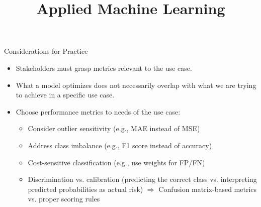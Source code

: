 \documentclass[11pt,compress,t,notes=noshow, aspectratio=169, xcolor=table]{beamer}
\title{Applied Machine Learning}
\date{}
\begin{document}
\newcommand{\titlefigure}{figure/dtrain_dtest_resampling}
\newcommand{\learninggoals}{
\item What is the difference between a loss function and a performance metric?
\item What are desirable properties of a performance metric?
\item What are guiding questions to select a performance metric?}



\begin{frame}{Considerations for Practice}

\begin{itemize}
    \item Stakeholders must grasp metrics relevant to the use case.
    \item What a model optimizes does not necessarily overlap with what we are trying to achieve in a specific use case.
    \item Choose performance metrics to needs of the use case:
    \begin{itemize}
        \item Consider outlier sensitivity (e.g., MAE instead of MSE)
        \item Address class imbalance (e.g., F1 score instead of accuracy)
        \item Cost-sensitive classification (e.g., use weights for FP/FN)
        \item Discrimination vs. calibration (predicting the correct class vs. interpreting predicted probabilities as actual risk) \newline
        $\Rightarrow$ Confusion matrix-based metrics vs. proper scoring rules
    \end{itemize}

\end{itemize}
\end{frame}
\end{document}
